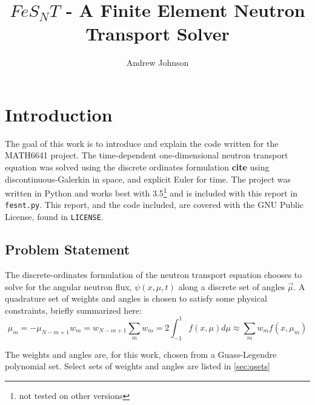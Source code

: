 \documentclass{article}
\title{$FeS_NT$ - A Finite Element Neutron Transport Solver}
\author{Andrew Johnson}
\begin{document}
\maketitle

\section{Introduction}
The goal of this work is to introduce and explain the code written for the MATH6641 project.
The time-dependent one-dimensional neutron transport equation was solved using the discrete 
ordinates formulation \textbf{cite} using discontinuous-Galerkin in space, and
explicit Euler for time.
The project was written in Python and works best with 3.5\footnote{not tested on other versions}
and is included with this report in \texttt{fesnt.py}.
This report, and the code included, are covered with the GNU Public License, found in \texttt{LICENSE}.

\subsection{Problem Statement}
The discrete-ordinates formulation of the neutron transport equation chooses to solve for the angular
neutron flux, $\psi(x, \mu, t)$ along a discrete set of angles $\vec{\mu}$. A quadrature set of 
weights and angles is chosen to satisfy some physical constraints, briefly summarized here:
\begin{subequations} \label{eq:quadRules}
    \begin{equation}
        \mu_m = -\mu_{N-m+1}
    \end{equation}
    \begin{equation}
        w_m = w_{N-m+1}
    \end{equation}
    \begin{equation}
        \sum_m w_m = 2
    \end{equation}
    \begin{equation}
        \int_{-1}^1f(x, \mu)d\mu\approx\sum_mw_m f(x, \mu_m)
    \end{equation}
\end{subequations}

The weights and angles are, for this work, chosen from a Guass-Legendre polynomial set.
Select sets of weights and angles are listed in \cref{sec:qsets}
\end{document}
